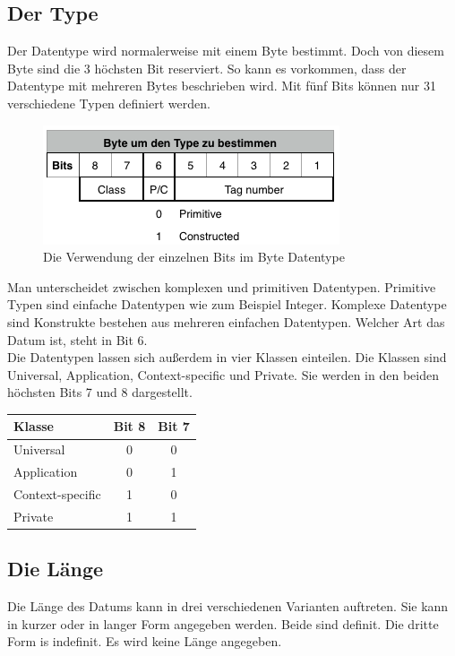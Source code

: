 \documentclass[11pt,a4paper]{article}
\begin{document}
\subsection{Der Type}
Der Datentype wird normalerweise mit einem Byte bestimmt. Doch von diesem Byte sind die 3 höchsten Bit reserviert. So kann es vorkommen, dass der Datentype mit mehreren Bytes beschrieben wird. Mit fünf Bits können nur 31 verschiedene Typen definiert werden.
\\
\begin{figure}[h]
	\centering
	\includegraphics[scale=1]{Bilder/Datentype-BER}
	\caption{Die Verwendung der einzelnen Bits im Byte Datentype}
\end{figure}

Man unterscheidet zwischen komplexen und primitiven Datentypen. Primitive Typen sind einfache Datentypen wie zum Beispiel Integer. Komplexe Datentype sind Konstrukte bestehen aus mehreren einfachen Datentypen. Welcher Art das Datum ist, steht in Bit 6.
\\
Die Datentypen lassen sich außerdem in vier Klassen einteilen. Die Klassen sind Universal, Application, Context-specific und Private. Sie werden in den beiden höchsten Bits 7 und 8 dargestellt.
\\
\emptyline
\begin{tabular}{| l | c | c |}
	\hline
	\rowcolor{lgray}
	Klasse					&		Bit 8		& Bit 7\\
	\hline
	Universal				&			0		&	0\\
	\hline
	Application			&			0		&	1\\
	\hline
	Context-specific	&			1		&	0\\
	\hline
	Private					&			1		&	1\\
	\hline
\end{tabular}

\subsection{Die Länge}
Die Länge des Datums kann in drei verschiedenen Varianten auftreten. Sie kann in kurzer oder in langer Form angegeben werden. Beide sind definit. Die dritte Form is indefinit. Es wird keine Länge angegeben.
\end{document}
